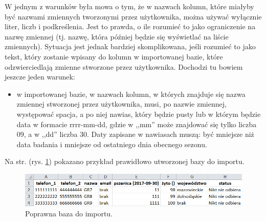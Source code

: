 \documentclass[12pt, twoside, hidelinks]{report}
\begin{document}
W jednym z warunków była mowa o tym, że w nazwach kolumn, które miałyby być nazwami zmiennych tworzonymi przez użytkownika, można używać wyłącznie liter, liczb i podkreślenia. Jest to prawda, o ile rozumieć to jako ograniczenie na nazwę zmiennej (tj. nazwę, która później będzie się wyświetlać na liście zmiennych). Sytuacja jest jednak bardziej skomplikowana, jeśli rozumieć to jako tekst, który zostanie wpisany do kolumn w importowanej bazie, które odzwierciedlają zmienne stworzone przez użytkownika. Dochodzi tu bowiem jeszcze jeden warunek:
\begin{itemize}
\item w importowanej bazie, w nazwach kolumn, w których znajduje się nazwa zmiennej stworzonej przez użytkownika, musi, po nazwie zmiennej, występować spacja, a po niej nawias, który będzie pusty lub w którym będzie data w formacie rrrr-mm-dd, gdzie w ,,mm'' może znajdować się tylko liczba 09, a w ,,dd'' liczba 30. Daty zapisane w nawiasach muszą: być mniejsze niż data badania i mniejsze od ostatniego dnia obecnego sezonu.
\end{itemize}
Na str. \pageref{wyglad_poprawnej_bazy_do_importu} (rys. \ref{wyglad_poprawnej_bazy_do_importu}) pokazano przykład prawidłowo utworzonej bazy do importu. \par \bigskip
\begin{figure}[h!]
\includegraphics[width = 1\textwidth]{2.2.}
\caption{Poprawna baza do importu.}
\label{wyglad_poprawnej_bazy_do_importu}
\end{figure}
\end{document}
